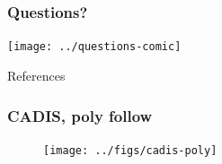 \documentclass[xcolor=x11names,compress]{beamer}
\renewcommand{\(}{\begin{columns}}
\renewcommand{\)}{\end{columns}}
\newcommand{\<}[1]{\begin{column}{#1}}
\renewcommand{\>}{\end{column}}
\begin{document}
\section*{}
\begin{frame}[fragile]
  \frametitle{Questions?}
  \begin{center}
  \texttt{[image: ../questions-comic]}  
  \end{center}
  
\end{frame}

\begin{frame}[allowframebreaks]{References}
	
	
\end{frame}


\begin{frame}[fragile]
  \frametitle{CADIS, poly follow}
 \begin{figure}[p]
   \begin{center}
     \texttt{[image: ../figs/cadis-poly]}
   \end{center}
 \end{figure}
\end{frame}
\end{document}
